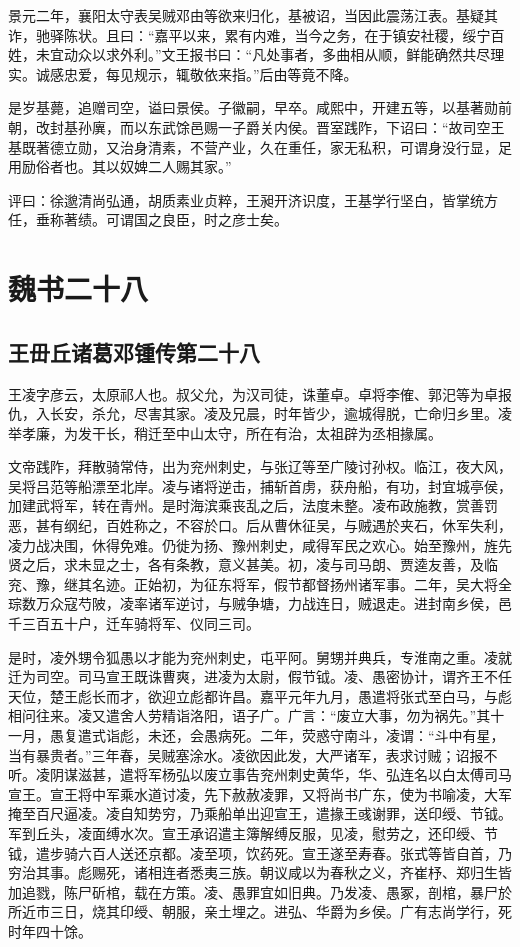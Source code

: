 \documentclass[12pt,UTF8]{ctexbook}
\begin{document}
景元二年，襄阳太守表吴贼邓由等欲来归化，基被诏，当因此震荡江表。基疑其诈，驰驿陈状。且曰：“嘉平以来，累有内难，当今之务，在于镇安社稷，绥宁百姓，未宜动众以求外利。”文王报书曰：“凡处事者，多曲相从顺，鲜能确然共尽理实。诚感忠爱，每见规示，辄敬依来指。”后由等竟不降。

是岁基薨，追赠司空，谥曰景侯。子徽嗣，早卒。咸熙中，开建五等，以基著勋前朝，改封基孙廙，而以东武馀邑赐一子爵关内侯。晋室践阼，下诏曰：“故司空王基既著德立勋，又治身清素，不营产业，久在重任，家无私积，可谓身没行显，足用励俗者也。其以奴婢二人赐其家。”

评曰：徐邈清尚弘通，胡质素业贞粹，王昶开济识度，王基学行坚白，皆掌统方任，垂称著绩。可谓国之良臣，时之彦士矣。

\part{魏书二十八}
\chapter{王毌丘诸葛邓锺传第二十八}

王凌字彦云，太原祁人也。叔父允，为汉司徒，诛董卓。卓将李傕、郭汜等为卓报仇，入长安，杀允，尽害其家。凌及兄晨，时年皆少，逾城得脱，亡命归乡里。凌举孝廉，为发干长，稍迁至中山太守，所在有治，太祖辟为丞相掾属。

文帝践阼，拜散骑常侍，出为兖州刺史，与张辽等至广陵讨孙权。临江，夜大风，吴将吕范等船漂至北岸。凌与诸将逆击，捕斩首虏，获舟船，有功，封宜城亭侯，加建武将军，转在青州。是时海滨乘丧乱之后，法度未整。凌布政施教，赏善罚恶，甚有纲纪，百姓称之，不容於口。后从曹休征吴，与贼遇於夹石，休军失利，凌力战决围，休得免难。仍徙为扬、豫州刺史，咸得军民之欢心。始至豫州，旌先贤之后，求未显之士，各有条教，意义甚美。初，凌与司马朗、贾逵友善，及临兖、豫，继其名迹。正始初，为征东将军，假节都督扬州诸军事。二年，吴大将全琮数万众寇芍陂，凌率诸军逆讨，与贼争塘，力战连日，贼退走。进封南乡侯，邑千三百五十户，迁车骑将军、仪同三司。

是时，凌外甥令狐愚以才能为兖州刺史，屯平阿。舅甥并典兵，专淮南之重。凌就迁为司空。司马宣王既诛曹爽，进凌为太尉，假节钺。凌、愚密协计，谓齐王不任天位，楚王彪长而才，欲迎立彪都许昌。嘉平元年九月，愚遣将张式至白马，与彪相问往来。凌又遣舍人劳精诣洛阳，语子广。广言：“废立大事，勿为祸先。”其十一月，愚复遣式诣彪，未还，会愚病死。二年，荧惑守南斗，凌谓：“斗中有星，当有暴贵者。”三年春，吴贼塞涂水。凌欲因此发，大严诸军，表求讨贼；诏报不听。凌阴谋滋甚，遣将军杨弘以废立事告兖州刺史黄华，华、弘连名以白太傅司马宣王。宣王将中军乘水道讨凌，先下赦赦凌罪，又将尚书广东，使为书喻凌，大军掩至百尺逼凌。凌自知势穷，乃乘船单出迎宣王，遣掾王彧谢罪，送印绶、节钺。军到丘头，凌面缚水次。宣王承诏遣主簿解缚反服，见凌，慰劳之，还印绶、节钺，遣步骑六百人送还京都。凌至项，饮药死。宣王遂至寿春。张式等皆自首，乃穷治其事。彪赐死，诸相连者悉夷三族。朝议咸以为春秋之义，齐崔杼、郑归生皆加追戮，陈尸斫棺，载在方策。凌、愚罪宜如旧典。乃发凌、愚冢，剖棺，暴尸於所近市三日，烧其印绶、朝服，亲土埋之。进弘、华爵为乡侯。广有志尚学行，死时年四十馀。
\end{document}
